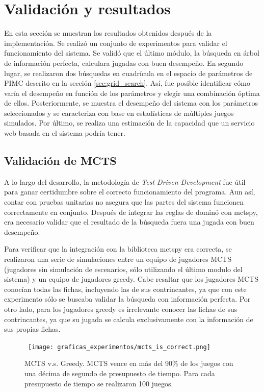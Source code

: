 \chapter{Validación y resultados}

\noindent
En esta sección se muestran los resultados obtenidos después de la
implementación. Se realizó un conjunto de experimentos para validar el
funcionamiento del sistema. Se validó que el último módulo, la búsqueda en árbol
de información perfecta, calculara jugadas con buen desempeño. En segundo lugar,
se realizaron dos búsquedas en cuadrícula en el espacio de parámetros de PIMC
descrito en la sección \ref{sec:grid_search}. Así, fue posible identificar cómo
varía el desempeño en función de los parámetros y elegir una combinación óptima
de ellos. Posteriormente, se muestra el desempeño del sistema con los parámetros
seleccionados y se caracteriza con base en estadísticas de múltiples juegos
simulados. Por último, se realiza una estimación de la capacidad que un servicio
web basada en el sistema podría tener.

\section{Validación de MCTS}

A lo largo del desarrollo, la metodología de  \textit{Test Driven Development}
fue útil para ganar certidumbre sobre el correcto funcionamiento del programa.
Aun así, contar con pruebas unitarias no asegura que las partes del sistema
funcionen correctamente en conjunto. Después de integrar las reglas de dominó
con mctspy, era necesario validar que el resultado de la búsqueda fuera una jugada
con buen desempeño.

Para verificar que la integración con la biblioteca mctspy era correcta, se
realizaron una serie de simulaciones entre un equipo de jugadores MCTS
(jugadores sin simulación de escenarios, sólo utilizando el último modulo del
sistema) y un equipo de jugadores greedy. Cabe resaltar que los jugadores MCTS
conocían todas las fichas, incluyendo las de sus contrincantes, ya que con este
experimento sólo se buscaba validar la búsqueda con información perfecta. Por
otro lado, para los jugadores greedy es irrelevante conocer las fichas de sus
contrincantes, ya que su jugada se calcula exclusivamente con la información de
sus propias fichas.

\begin{figure}[H]
    \begin{center}
        \hbox{\hspace{-2em}
            \texttt{[image: graficas\_experimentos/mcts\_is\_correct.png]}}
        \caption{MCTS v.s. Greedy. MCTS vence en más del 90\% de los juegos con
            una décima de segundo de presupuesto de tiempo. Para cada presupuesto de
            tiempo se realizaron 100 juegos.}
        \label{MGA}
    \end{center}
\end{figure}

